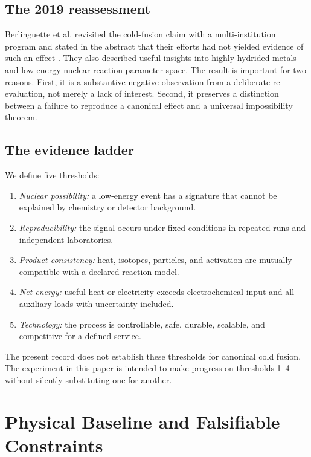 \documentclass[conference]{IEEEtran}
\begin{document}
\subsection{The 2019 reassessment}
Berlinguette et al. revisited the cold-fusion claim with a multi-institution program and stated in the abstract that their efforts had not yielded evidence of such an effect \cite{berlinguette2019}. They also described useful insights into highly hydrided metals and low-energy nuclear-reaction parameter space. The result is important for two reasons. First, it is a substantive negative observation from a deliberate re-evaluation, not merely a lack of interest. Second, it preserves a distinction between a failure to reproduce a canonical effect and a universal impossibility theorem.

\subsection{The evidence ladder}
We define five thresholds:
\begin{enumerate}
\item \emph{Nuclear possibility:} a low-energy event has a signature that cannot be explained by chemistry or detector background.
\item \emph{Reproducibility:} the signal occurs under fixed conditions in repeated runs and independent laboratories.
\item \emph{Product consistency:} heat, isotopes, particles, and activation are mutually compatible with a declared reaction model.
\item \emph{Net energy:} useful heat or electricity exceeds electrochemical input and all auxiliary loads with uncertainty included.
\item \emph{Technology:} the process is controllable, safe, durable, scalable, and competitive for a defined service.
\end{enumerate}
The present record does not establish these thresholds for canonical cold fusion. The experiment in this paper is intended to make progress on thresholds 1--4 without silently substituting one for another.

\section{Physical Baseline and Falsifiable Constraints}
\label{sec:physics}
\end{document}
